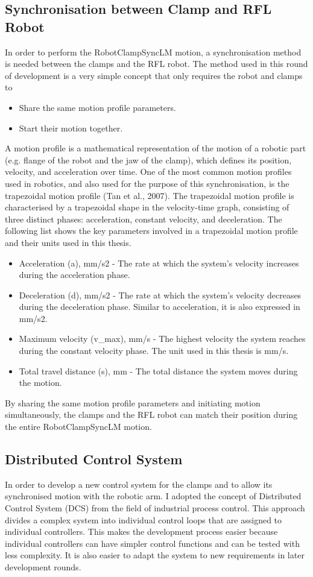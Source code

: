 \subsection{Synchronisation between Clamp and RFL Robot}
In order to perform the RobotClampSyncLM motion, a synchronisation method is needed between the clamps and the RFL robot. The method used in this round of development is a very simple concept that only requires the robot and clamps to
\begin{itemize}
    \item Share the same motion profile parameters.
    \item Start their motion together.
\end{itemize}
    A motion profile is a mathematical representation of the motion of a robotic part (e.g. flange of the robot and the jaw of the clamp), which defines its position, velocity, and acceleration over time. One of the most common motion profiles used in robotics, and also used for the purpose of this synchronisation, is the trapezoidal motion profile (Tan et al., 2007).
The trapezoidal motion profile is characterised by a trapezoidal shape in the velocity-time graph, consisting of three distinct phases: acceleration, constant velocity, and deceleration. The following list shows the key parameters involved in a trapezoidal motion profile and their units used in this thesis.
\begin{itemize}
    \item Acceleration (a), mm/s2 - The rate at which the system's velocity increases during the acceleration phase. 
    \item Deceleration (d), mm/s2 - The rate at which the system's velocity decreases during the deceleration phase. Similar to acceleration, it is also expressed in mm/s2. 
    \item Maximum velocity (v_max), mm/s - The highest velocity the system reaches during the constant velocity phase. The unit used in this thesis is mm/s. 
    \item Total travel distance (s), mm - The total distance the system moves during the motion. 
\end{itemize}

By sharing the same motion profile parameters and initiating motion simultaneously, the clamps and the RFL robot can match their position during the entire RobotClampSyncLM motion.

\subsection{Distributed Control System}
In order to develop a new control system for the clamps and to allow its synchronised motion with the robotic arm. I adopted the concept of Distributed Control System (DCS) from the field of industrial process control. This approach divides a complex system into individual control loops that are assigned to individual controllers. This makes the development process easier because individual controllers can have simpler control functions and can be tested with less complexity. It is also easier to adapt the system to new requirements in later development rounds. 

